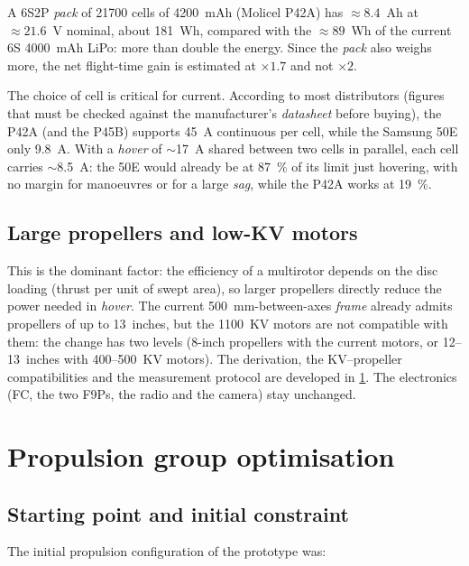 A 6S2P \emph{pack} of 21700 cells of 4200~mAh (Molicel P42A) has $\approx 8.4$~Ah at $\approx 21.6$~V nominal, about 181~Wh, compared with the $\approx 89$~Wh of the current 6S 4000~mAh LiPo: more than double the energy. Since the \emph{pack} also weighs more, the net flight-time gain is estimated at $\times 1.7$ and not $\times 2$.

The choice of cell is critical for current. According to most distributors (figures that must be checked against the manufacturer's \emph{datasheet} before buying), the P42A (and the P45B) supports 45~A continuous per cell, while the Samsung 50E only 9.8~A. With a \emph{hover} of $\sim$17~A shared between two cells in parallel, each cell carries $\sim$8.5~A: the 50E would already be at 87~\% of its limit just hovering, with no margin for manoeuvres or for a large \emph{sag}, while the P42A works at 19~\%.

\subsection{Large propellers and low-KV motors}
\label{subsec:autonomia-frame}

This is the dominant factor: the efficiency of a multirotor depends on the disc loading (thrust per unit of swept area), so larger propellers directly reduce the power needed in \emph{hover}. The current 500~mm-between-axes \emph{frame} already admits propellers of up to 13~inches, but the 1100~KV motors are not compatible with them: the change has two levels (8-inch propellers with the current motors, or 12--13~inches with 400--500~KV motors). The derivation, the KV--propeller compatibilities and the measurement protocol are developed in \cref{sec:propulsor}. The electronics (FC, the two F9Ps, the radio and the camera) stay unchanged.

\section{Propulsion group optimisation}
\label{sec:propulsor}

\subsection{Starting point and initial constraint}
\label{subsec:propulsor-inicial}

The initial propulsion configuration of the prototype was:

